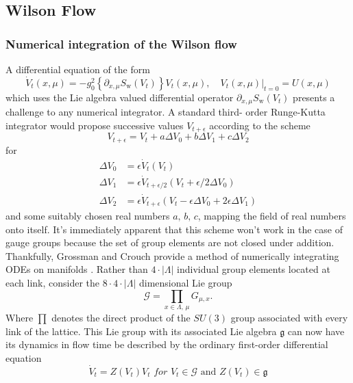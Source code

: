 \documentclass[a4paper,10pt]{article}
\begin{document}
\subsection{Wilson Flow}

\subsubsection{Numerical integration of the Wilson flow}
A differential equation of the form 
\begin{equation}\label{eq:WF_diffeq}
\dot{V}_{t}(x, \mu)=-g_{0}^{2}\left\{\partial_{x, \mu} S_{\mathrm{w}}\left(V_{t}\right)\right\} V_{t}(x, \mu),\left.\quad V_{t}(x, \mu)\right|_{t=0}=U(x, \mu)
\end{equation}
which uses the Lie algebra valued differential operator $\partial_{x, \mu} S_{\mathrm{w}}\left(V_{t}\right)$ presents a challenge to any numerical integrator. A standard third- order Runge-Kutta integrator would  propose successive values $V_{t+\epsilon}$ according to the scheme 
$$
V_{t+\epsilon} = V_{t}+a\Delta V_0+b\Delta V_1 + c\Delta V_2
$$
for
\begin{equation*}
\begin{aligned} 
\Delta V_0 &= \epsilon \dot{V}_{t}\left( V_{t} \right)\\
\Delta V_1 &= \epsilon \dot{V}_{t+\epsilon/2}\left( V_{t} +\epsilon/2 \Delta V_0\right)\\
\Delta V_2 &= \epsilon \dot{V}_{t+\epsilon}\left( V_{t} -\epsilon \Delta V_0 + 2\epsilon\Delta V_1 \right)
\end{aligned}
\end{equation*}
and some suitably chosen real numbers $a,\,b,\,c$, mapping the field of real numbers onto itself. It's immediately apparent that this scheme won't work in the case of gauge groups because the set of group elements are not closed under addition.\\Thankfully, Grossman and Crouch provide a method of numerically integrating ODEs on manifolds \cite{CrouchP.E.1993Nioo}. Rather than $4\cdot\left| \Lambda \right|$ individual group elements located at each link, consider the $8\cdot4\cdot\left| \Lambda \right|$ dimensional Lie group $$\mathcal{G} =\prod\limits_{x\in \Lambda ,\,\mu}\!\!\!G_{\mu,x}.$$ Where $\prod$ denotes the direct product of the $SU(3)$ group associated with every link of the lattice. This Lie group with its associated Lie algebra $\mathfrak{g}$ can now have its dynamics in flow time be described by the ordinary first-order differential equation
\begin{equation}
\dot{V}_{t}=Z\left(V_{t}\right) V_{t}\,\,for\,\,V_{t} \in \mathcal{G} \text { and } Z\left(V_{t}\right) \in \mathfrak{g}
\end{equation}
\end{document}
